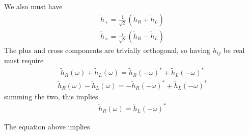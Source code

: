 \documentclass[aps,prd,twocolumn,superscriptaddress,preprintnumbers,floatfix,nofootinbib]{revtex4-2}
\begin{document}
We also must have
\begin{align}
\tilde{h}_+ = \frac{1}{\sqrt{2}} \left(\tilde{h}_R + \tilde{h}_L \right)
\end{align}
\begin{align}
\tilde{h}_\times = \frac{i}{\sqrt{2}} \left(\tilde{h}_R - \tilde{h}_L \right)
\end{align}
The plus and cross components are trivially orthogonal, so having $h_{ij}$ be real must require
\begin{align}
\tilde{h}_R(\omega) + \tilde{h}_L(\omega) = \tilde{h}_R(-\omega)^* + \tilde{h}_L(-\omega)^*
\end{align}
\begin{align}
\tilde{h}_R(\omega) - \tilde{h}_L(\omega) = -\tilde{h}_R(-\omega)^* + \tilde{h}_L(-\omega)^*
\end{align}
summing the two, this implies
\begin{align}
\tilde{h}_R(\omega) = \tilde{h}_L(-\omega)^*
\end{align}

The equation above implies



\end{document}
